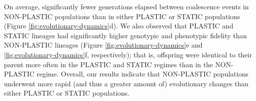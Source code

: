 
On average, significantly fewer generations elapsed between coalescence events in NON-PLASTIC populations than in either PLASTIC or STATIC populations (Figure \ref{fig:evolutionary-dynamics}d).
We also observed that PLASTIC and STATIC lineages had significantly higher genotypic and phenotypic fidelity than NON-PLASTIC lineages (Figure \ref{fig:evolutionary-dynamics}e and \ref{fig:evolutionary-dynamics}f, respectively); that is, offspring were identical to their parent more often in the PLASTIC and STATIC regimes than in the NON-PLASTIC regime.
Overall, our results indicate that NON-PLASTIC populations underwent more rapid (and thus a greater amount of) evolutionary changes than either PLASTIC or STATIC populations. 




